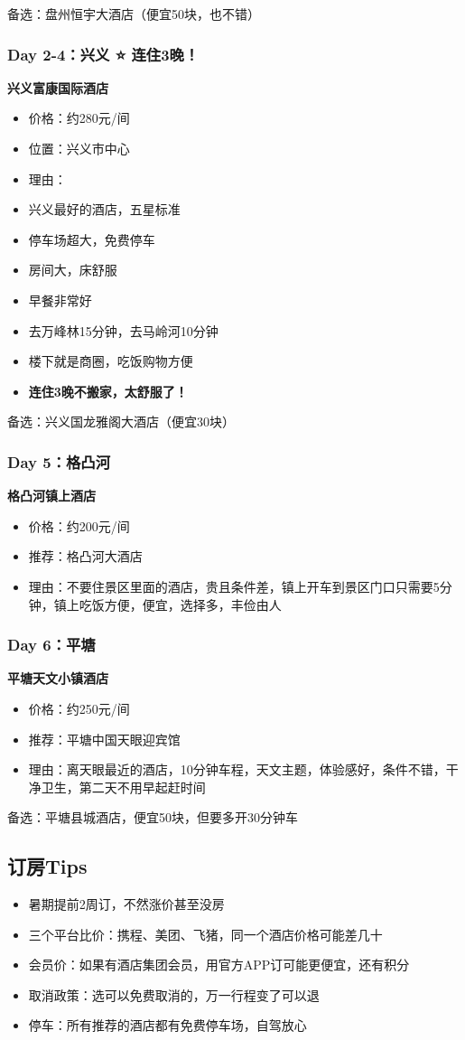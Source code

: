 \documentclass[12pt,a4paper,UTF8]{ctexart}
\begin{document}
备选：盘州恒宇大酒店（便宜50块，也不错）

\subsubsection{Day 2-4：兴义 ⭐ 连住3晚！}
\textbf{兴义富康国际酒店}
\begin{itemize}
\item 价格：约280元/间
\item 位置：兴义市中心
\item 理由：
\item 兴义最好的酒店，五星标准
\item 停车场超大，免费停车
\item 房间大，床舒服
\item 早餐非常好
\item 去万峰林15分钟，去马岭河10分钟
\item 楼下就是商圈，吃饭购物方便
\item \textbf{连住3晚不搬家，太舒服了！}
\end{itemize}

备选：兴义国龙雅阁大酒店（便宜30块）

\subsubsection{Day 5：格凸河}
\textbf{格凸河镇上酒店}
\begin{itemize}
\item 价格：约200元/间
\item 推荐：格凸河大酒店
\item 理由：不要住景区里面的酒店，贵且条件差，镇上开车到景区门口只需要5分钟，镇上吃饭方便，便宜，选择多，丰俭由人
\end{itemize}

\subsubsection{Day 6：平塘}
\textbf{平塘天文小镇酒店}
\begin{itemize}
\item 价格：约250元/间
\item 推荐：平塘中国天眼迎宾馆
\item 理由：离天眼最近的酒店，10分钟车程，天文主题，体验感好，条件不错，干净卫生，第二天不用早起赶时间
\end{itemize}

备选：平塘县城酒店，便宜50块，但要多开30分钟车

\subsection{订房Tips}
\begin{itemize}
\item 暑期提前2周订，不然涨价甚至没房
\item 三个平台比价：携程、美团、飞猪，同一个酒店价格可能差几十
\item 会员价：如果有酒店集团会员，用官方APP订可能更便宜，还有积分
\item 取消政策：选可以免费取消的，万一行程变了可以退
\item 停车：所有推荐的酒店都有免费停车场，自驾放心
\end{itemize}
\end{document}

